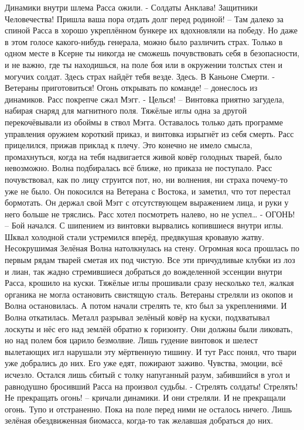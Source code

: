 \documentclass[a4paper, 12pt]{report}
\begin{document}
	Динамики внутри шлема Расса ожили.
	- Солдаты Анклава! Защитники Человечества! Пришла ваша пора отдать долг перед родиной! – 
	Там далеко за спиной Расса в хорошо укреплённом бункере их вдохновляли на победу. Но даже в этом голосе какого-нибудь генерала, можно было различить страх.	Только в одном месте в Ксерне ты никогда не сможешь почувствовать себя в безопасности, и не важно, где ты находишься, на поле боя или в окружении толстых стен и могучих солдат. Здесь страх найдёт тебя везде. 
Здесь.
	В Каньоне Смерти.
	- Ветераны приготовиться! Огонь открывать по команде! – донеслось из динамиков.
	Расс покрепче сжал Мэгг.
	- Целься! –
	Винтовка приятно загудела, набирая снаряд для магнитного поля. Тяжёлые иглы одна за другой перекочёвывали из обоймы в ствол Мэгга. Оставалось только дать программе управления оружием короткий приказ, и винтовка изрыгнёт из себя смерть. Расс прицелился, прижав приклад к плечу. Это конечно не имело смысла, промахнуться, когда на тебя надвигается живой ковёр голодных тварей, было невозможно.
	Волна подбиралась всё ближе, но приказа не поступало. Расс почувствовал, как по лицу струится пот, но, ни волнения, ни страха почему-то уже не было. Он покосился на Ветерана с Востока, и заметил, что тот перестал бормотать. Он держал свой Мэгг с отсутствующем выражением лица, и руки у него больше не тряслись. Расс хотел посмотреть налево, но не успел…
	- ОГОНЬ! –
	Бой начался.
	С шипением из винтовки вырвались копившиеся внутри иглы. Шквал холодной стали устремился вперёд, предвкушая кровавую жатву.  Несокрушимая Зелёная Волна натолкнулась на стену. Огромная коса прошлась по первым рядам тварей сметая их под чистую. Все эти причудливые клубки из лоз и лиан, так жадно стремившиеся добраться до вожделенной эссенции внутри Расса, крошило на куски. Тяжёлые иглы прошивали сразу несколько тел, жалкая органика не могла остановить свистящую сталь. Ветераны стреляли из окопов и Волна остановилась.
	А потом начали стрелять те, кто был за укреплениями.
	И Волна откатилась.
	Металл разрывал зелёный ковёр на куски, подхватывал лоскуты и нёс его над землёй обратно к горизонту.
	Они должны были ликовать, но над полем боя царило безмолвие. Лишь гудение винтовок и шелест вылетающих игл нарушали эту мёртвенную тишину. 
	И тут Расс понял, что твари уже добрались до них. Его уже едят, пожирают заживо. Чувства, эмоции, всё исчезло. Остался лишь сбитый с толку напуганный разум, забившийся в угол и равнодушно бросивший Расса на произвол судьбы.
	- Стрелять солдаты! Стрелять! Не прекращать огонь! – кричали динамики.
	И они стреляли. И не прекращали огонь. Тупо и отстраненно. Пока на поле перед ними не осталось ничего. Лишь зелёная обездвиженная биомасса, когда-то так желавшая добраться до них. 
\end{document}
